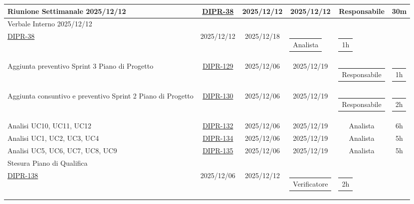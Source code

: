 \documentclass[a4paper,12pt]{article}
\begin{document}
\begin{longtable}{|p{4cm}|c|c|c|c|c|}
            \hline
            Riunione Settimanale 2025/12/12 & \href{https://7zpus.atlassian.net/browse/DIPR-38}{DIPR-38} & 2025/12/12 & 2025/12/12 & Responsabile & 30m\\
            \hline
            Verbale Interno 2025/12/12 & \begin{tabular}[c]{@{}c@{}} \href{https://7zpus.atlassian.net/browse/DIPR-122}{DIPR-122} \\\href{https://7zpus.atlassian.net/browse/DIPR-38}{DIPR-38} \end{tabular} & 2025/12/12 & 2025/12/18 & \begin{tabular}[c]{@{}c@{}} Analista \end{tabular} & \begin{tabular}[c]{@{}c@{}} 1h \end{tabular} \\
            \hline
            Aggiunta preventivo Sprint 3 Piano di Progetto & \href{https://7zpus.atlassian.net/browse/DIPR-129}{DIPR-129} & 2025/12/06 & 2025/12/19 & \begin{tabular}[c]{@{}c@{}} Responsabile \end{tabular} & \begin{tabular}[c]{@{}c@{}} 1h \end{tabular} \\
            \hline
            Aggiunta consuntivo e preventivo Sprint 2 Piano di Progetto & \href{https://7zpus.atlassian.net/browse/DIPR-130}{DIPR-130} & 2025/12/06 & 2025/12/19 & \begin{tabular}[c]{@{}c@{}} Responsabile \end{tabular} & \begin{tabular}[c]{@{}c@{}} 2h \end{tabular} \\
            \hline
            Analisi UC10, UC11, UC12 & \href{https://7zpus.atlassian.net/browse/DIPR-132}{DIPR-132} & 2025/12/06 & 2025/12/19 & Analista & 6h\\
            \hline
            Analisi UC1, UC2, UC3, UC4 & \href{https://7zpus.atlassian.net/browse/DIPR-134}{DIPR-134} & 2025/12/06 & 2025/12/19 & Analista & 5h\\
            \hline
            Analisi UC5, UC6, UC7, UC8, UC9 & \href{https://7zpus.atlassian.net/browse/DIPR-135}{DIPR-135} & 2025/12/06 & 2025/12/19 & Analista & 5h\\
            \hline
            Stesura Piano di Qualifica & \begin{tabular}[c]{@{}c@{}} \href{https://7zpus.atlassian.net/browse/DIPR-137}{DIPR-137} \\\href{https://7zpus.atlassian.net/browse/DIPR-138}{DIPR-138} \end{tabular} & 2025/12/06 & 2025/12/12 & \begin{tabular}[c]{@{}c@{}} Verificatore \end{tabular} & \begin{tabular}[c]{@{}c@{}} 2h \end{tabular} \\

\end{longtable}
\end{document}
